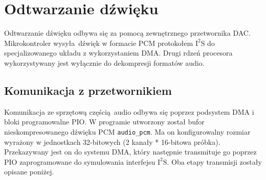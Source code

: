 \documentclass[polish]{aghengthesis}
\newcommand{\isqs}{$\text{I}^{2}\text{S}$}
\begin{document}
	\section{Odtwarzanie dźwięku}
%		
%		
%		
		
		
			
		Odtwarzanie dźwięku odbywa się za pomocą zewnętrznego przetwornika DAC. Mikrokontroler wysyła dźwięk w formacie PCM protokołem \isqs{} do specjalizowanego układu z wykorzystaniem DMA. Drugi rdzeń procesora wykorzystywany jest wyłącznie do dekompresji formatów audio.
		
		
		\subsection{Komunikacja z przetwornikiem}
			Komunikacja ze sprzętową częścią audio odbywa się poprzez podsystem DMA i bloki programowalne PIO.
			W programie utworzony został bufor nieskompresowanego dźwięku PCM \lstinline|audio_pcm|. Ma on konfigurowalny rozmiar wyrażony w jednostkach 32-bitowych (2 kanały * 16-bitowa próbka). Przekazywany jest on do systemu DMA, który następnie transmituje go poprzez PIO zaprogramowane do symulowania interfejsu \isqs{}. Oba etapy transmisji zostały opisane poniżej.
		
\end{document}
